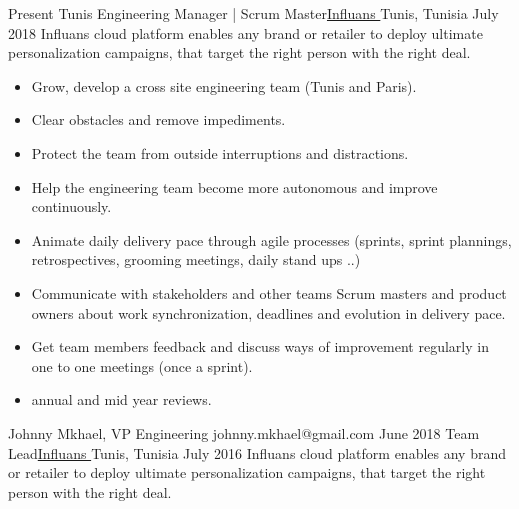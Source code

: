 %
%
%
\begin{experiences}
  \experienceWithReferenceNoTechno
  {Present}       {Tunis Engineering Manager | Scrum Master}{\href{https://www.influans.com}{Influans \faExternalLink}}{Tunis, Tunisia}
  {July 2018}      {Influans cloud platform enables any brand or retailer to deploy ultimate personalization campaigns, that target the right person with the right deal.}
                    {
                      \begin{itemize}
                        \item Grow, develop a cross site engineering team (Tunis and Paris).
                        \item Clear obstacles and remove impediments.
                        \item Protect the team from outside interruptions and distractions.
                        \item Help the engineering team become more autonomous and improve continuously.
                        \item Animate daily delivery pace through agile processes (sprints, sprint plannings, retrospectives, grooming meetings, daily stand ups ..)
                        \item Communicate with stakeholders and other teams Scrum masters and product owners about work synchronization, deadlines and evolution in delivery pace.
                        \item Get team members feedback and discuss ways of improvement regularly in one to one meetings (once a sprint).
                        \item annual and mid year reviews.
                      \end{itemize}
                    }
                    {Johnny Mkhael, VP Engineering} {johnny.mkhael@gmail.com}
  \emptySeparator   
  \experienceWithReferenceNoTechno
    {June 2018}       {Team Lead}{\href{https://www.influans.com}{Influans \faExternalLink}}{Tunis, Tunisia}
    {July 2016}      {Influans cloud platform enables any brand or retailer to deploy ultimate personalization campaigns, that target the right person with the right deal.}

\end{experiences}
